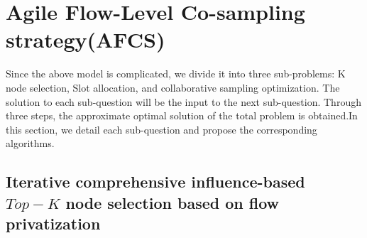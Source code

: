 \documentclass[conference]{IEEEtran}
\begin{document}
\section{Agile Flow-Level Co-sampling strategy(AFCS)}
Since the above model is complicated, we divide it into three sub-problems: K node selection, Slot allocation, and collaborative sampling optimization. The solution to each sub-question will be the input to the next sub-question. Through three steps, the approximate optimal solution of the total problem is obtained.In this section, we detail each sub-question and propose the corresponding algorithms.

\subsection{Iterative comprehensive influence-based $Top-K$ node selection based on flow privatization} 
\end{document}
